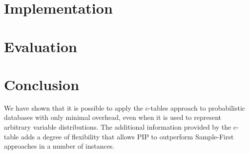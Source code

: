 \documentclass{vldb}
\begin{document}
\section{Implementation}
\label{sec:implementation}


\section{Evaluation}
\label{sec:evaluation}



\section{Conclusion}

We have shown that it is possible to apply the c-tables approach to probabilistic databases with only minimal overhead, even when it is used to represent arbitrary variable distributions.  The additional information provided by the c-table adds a degree of flexibility that allows PIP to outperform Sample-First approaches in a number of instances.

\begin{small}


\end{small}
\end{document}
